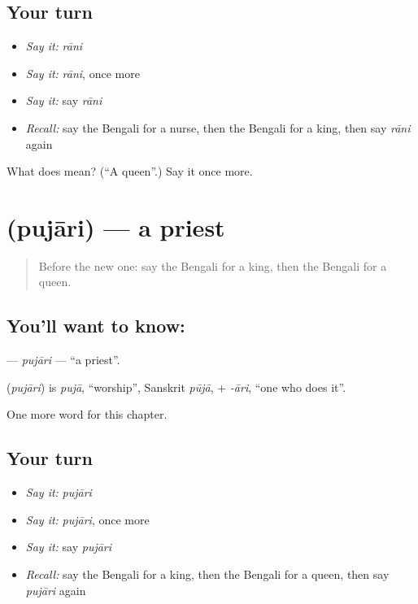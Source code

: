 \subsection*{Your turn}
\begin{itemize}
\raggedright
  \item \emph{Say it:} \emph{rāni}
  \item \emph{Say it:} \emph{rāni}, once more
  \item \emph{Say it:} say \emph{rāni}
  \item \emph{Recall:} say the Bengali for a nurse, then the Bengali for a king, then say \emph{rāni} again
\end{itemize}

\begin{tcolorbox}[breakable,colback=teal!4,colframe=teal!35!black,title={Before you move on}]
What does  mean? (\textquotedblleft{}A queen\textquotedblright{}.) Say it once more.
\end{tcolorbox}
\section[\texorpdfstring{\bn{পুজারি} (pujāri)}{পুজারি (pujāri)}]{ (pujāri) — a priest}

\label{lesson:BN-C127-pujari}



\begin{quote}
Before the new one: say the Bengali for a king, then the Bengali for a queen.
\end{quote}

\subsection*{You'll want to know: }
\textbf{} — \emph{pujāri} — \textquotedblleft{}a priest\textquotedblright{}.

\begin{cousinweb}
\textbf{} (\emph{pujāri}) is \emph{pujā}, \textquotedblleft{}worship\textquotedblright{}, Sanskrit \emph{pūjā}, + \emph{-āri}, \textquotedblleft{}one who does it\textquotedblright{}.
\end{cousinweb}

\begin{grammarlens}[title={What you've built}]
One more word for this chapter.
\end{grammarlens}

\subsection*{Your turn}
\begin{itemize}
\raggedright
  \item \emph{Say it:} \emph{pujāri}
  \item \emph{Say it:} \emph{pujāri}, once more
  \item \emph{Say it:} say \emph{pujāri}
  \item \emph{Recall:} say the Bengali for a king, then the Bengali for a queen, then say \emph{pujāri} again
\end{itemize}

